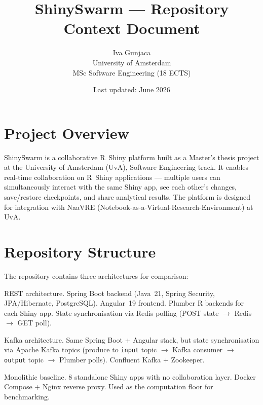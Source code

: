 \documentclass[12pt,a4paper]{article}
\title{ShinySwarm --- Repository Context Document}
\author{Iva Gunjaca \\ University of Amsterdam \\ MSc Software Engineering (18 ECTS)}
\date{Last updated: June 2026}
\begin{document}
\maketitle

\tableofcontents
\newpage

\section{Project Overview}

ShinySwarm is a collaborative R~Shiny platform built as a Master's thesis
project at the University of Amsterdam (UvA), Software Engineering track.
It enables real-time collaboration on R~Shiny applications --- multiple users
can simultaneously interact with the same Shiny app, see each other's changes,
save/restore checkpoints, and share analytical results. The platform is designed
for integration with NaaVRE (Notebook-as-a-Virtual-Research-Environment) at UvA.

\section{Repository Structure}

The repository contains three architectures for comparison:

\begin{description}[style=nextline]
  \item[\texttt{Thesis-Project-Final-RESTAPI/}]
    REST architecture. Spring Boot backend (Java~21, Spring Security, JPA/Hibernate,
    PostgreSQL). Angular~19 frontend. Plumber R backends for each Shiny app.
    State synchronisation via Redis polling
    (POST state $\rightarrow$ Redis $\rightarrow$ GET poll).

  \item[\texttt{Thesis-Project-Final-Kafka/}]
    Kafka architecture. Same Spring Boot + Angular stack, but state synchronisation
    via Apache Kafka topics (produce to \texttt{input} topic $\rightarrow$ Kafka
    consumer $\rightarrow$ \texttt{output} topic $\rightarrow$ Plumber polls).
    Confluent Kafka + Zookeeper.

  \item[\texttt{whole\_apps/}]
    Monolithic baseline. 8 standalone Shiny apps with no collaboration layer.
    Docker Compose + Nginx reverse proxy. Used as the computation floor for
    benchmarking.
\end{description}
\end{document}
